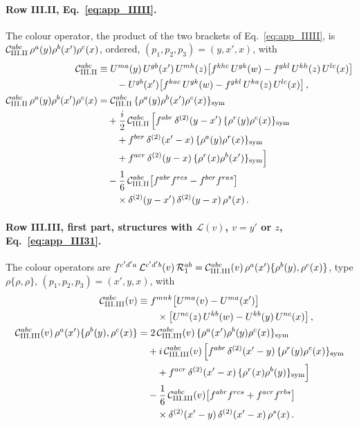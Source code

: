 \paragraph{Row III.II, Eq.~\eqref{eq:app_IIIII}.} The colour operator, the product of the two brackets of Eq.~\eqref{eq:app_IIIII}, is $\mathcal C^{abc}_{\rm III.II}\,\rho^a(y)\rho^b(x')\rho^c(x)$, ordered, $(p_1,p_2,p_3)=(y,x',x)$, with
\begin{align}
\mathcal C^{abc}_{\rm III.II}&\equiv U^{ma}(y)\,U^{gb}(x')\,U^{mh}(z)\big[f^{khc}\,U^{gk}(w)-f^{gkl}\,U^{kh}(z)\,U^{lc}(x)\big]\notag\\
&\qquad-U^{gb}(x')\big[f^{kac}\,U^{gk}(w)-f^{gkl}\,U^{ka}(z)\,U^{lc}(x)\big]\,,\notag\\
\mathcal C^{abc}_{\rm III.II}\,\rho^a(y)\rho^b(x')\rho^c(x)
&=\mathcal C^{abc}_{\rm III.II}\,\{\rho^a(y)\rho^b(x')\rho^c(x)\}_{\rm sym}\notag\\
&\quad+\frac i2\,\mathcal C^{abc}_{\rm III.II}\,\Big[f^{abr}\,\delta^{(2)}(y-x')\,\{\rho^{r}(y)\rho^{c}(x)\}_{\rm sym}\notag\\
&\qquad+f^{bcr}\,\delta^{(2)}(x'-x)\,\{\rho^{a}(y)\rho^{r}(x)\}_{\rm sym}\notag\\
&\qquad+f^{acr}\,\delta^{(2)}(y-x)\,\{\rho^{r}(x)\rho^{b}(x')\}_{\rm sym}\Big]\notag\\
&\quad-\frac16\,\mathcal C^{abc}_{\rm III.II}\big[f^{abr}f^{rcs}-f^{bcr}f^{ras}\big]\notag\\
&\qquad\times\delta^{(2)}(y-x')\,\delta^{(2)}(y-x)\,\rho^s(x)\,.\label{eq:app_sym_IIIII}
\end{align}
\paragraph{Row III.III, first part, structures with $\mathcal L(v)$, $v=y'$ or $z$, Eq.~\eqref{eq:app_III31}.} The colour operators are $f^{c'd'a}\,\mathcal L^{c'd'b}(v)\,\mathcal R_1^{ab}=\mathcal C^{abc}_{\rm III.III}(v)\,\rho^a(x')\{\rho^b(y),\rho^c(x)\}$, type $\rho\{\rho,\rho\}$, $(p_1,p_2,p_3)=(x',y,x)$, with
\begin{align}
\mathcal C^{abc}_{\rm III.III}(v)&\equiv f^{mnk}\big[U^{ma}(v)-U^{ma}(x')\big]\notag\\
&\qquad\times\big[U^{nc}(z)\,U^{kb}(w)-U^{kb}(y)\,U^{nc}(x)\big]\,,\notag\\
\mathcal C^{abc}_{\rm III.III}(v)\,\rho^a(x')\{\rho^b(y),\rho^c(x)\}
&=2\,\mathcal C^{abc}_{\rm III.III}(v)\,\{\rho^a(x')\rho^b(y)\rho^c(x)\}_{\rm sym}\notag\\
&\quad+i\,\mathcal C^{abc}_{\rm III.III}(v)\,\Big[f^{abr}\,\delta^{(2)}(x'-y)\,\{\rho^{r}(y)\rho^{c}(x)\}_{\rm sym}\notag\\
&\qquad+f^{acr}\,\delta^{(2)}(x'-x)\,\{\rho^{r}(x)\rho^{b}(y)\}_{\rm sym}\Big]\notag\\
&\quad-\frac16\,\mathcal C^{abc}_{\rm III.III}(v)\big[f^{abr}f^{rcs}+f^{acr}f^{rbs}\big]\notag\\
&\qquad\times\delta^{(2)}(x'-y)\,\delta^{(2)}(x'-x)\,\rho^s(x)\,.\label{eq:app_sym_IIIIII}
\end{align}
